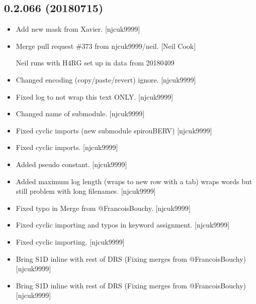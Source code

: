 \documentclass[a4paper,10pt,english]{report}
\begin{document}
\subsection{0.2.066 (2018\sphinxhyphen{}07\sphinxhyphen{}15)}
\label{\detokenize{misc/changelog:id411}}\begin{itemize}
\item {} 
Add new mask from Xavier. {[}njcuk9999{]}

\item {} 
Merge pull request \#373 from njcuk9999/neil. {[}Neil Cook{]}

Neil \sphinxhyphen{} runs with H4RG set up in data from 2018\sphinxhyphen{}04\sphinxhyphen{}09

\item {} 
Changed encoding (copy/paste/revert) \textendash{} ignore. {[}njcuk9999{]}

\item {} 
Fixed log to not wrap this text \sphinxhyphen{} ONLY. {[}njcuk9999{]}

\item {} 
Changed name of sub\sphinxhyphen{}module. {[}njcuk9999{]}

\item {} 
Fixed cyclic imports (new sub\sphinxhyphen{}module \sphinxhyphen{} spirouBERV) {[}njcuk9999{]}

\item {} 
Fixed cyclic imports. {[}njcuk9999{]}

\item {} 
Added  pseudo constant. {[}njcuk9999{]}

\item {} 
Added maximum log length (wraps to new row with a tab) wraps words but
still problem with long filenames. {[}njcuk9999{]}

\item {} 
Fixed typo in Merge from @FrancoisBouchy. {[}njcuk9999{]}

\item {} 
Fixed cyclic importing and typos in keyword assignment. {[}njcuk9999{]}

\item {} 
Fixed cyclic importing. {[}njcuk9999{]}

\item {} 
Bring S1D  in\sphinxhyphen{}line with rest of DRS (Fixing merges from
@FrancoisBouchy) {[}njcuk9999{]}

\item {} 
Bring S1D  in\sphinxhyphen{}line with rest of DRS (Fixing merges from
@FrancoisBouchy) {[}njcuk9999{]}


\end{itemize}
\end{document}
